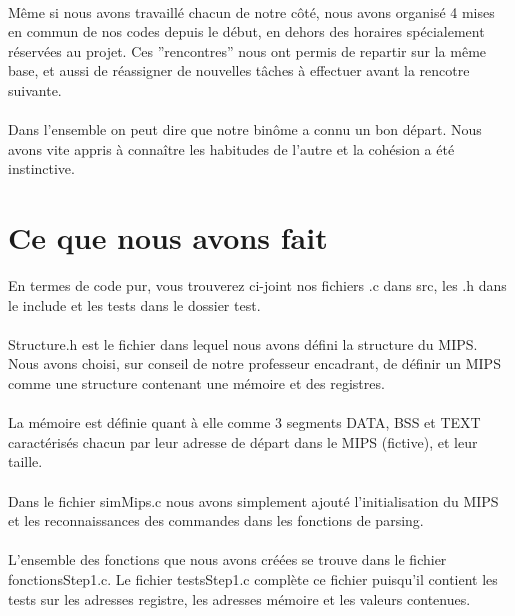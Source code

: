 \documentclass[10pt,a4paper]{report}
\begin{document}
\paragraph{}
Même si nous avons travaillé chacun de notre côté, nous avons organisé 4 mises en commun de nos codes depuis le début, en dehors des horaires spécialement réservées au projet. Ces ''rencontres'' nous ont permis de repartir sur la même base, et aussi de réassigner de nouvelles tâches à effectuer avant la rencotre suivante.
\paragraph{}	
Dans l'ensemble on peut dire que notre binôme a connu un bon départ. Nous avons vite appris à connaître les habitudes de l'autre et la cohésion a été instinctive.


\section{Ce que nous avons fait}

En termes de code pur, vous trouverez ci-joint nos fichiers .c dans src, les .h dans le include et les tests dans le dossier test.
\paragraph{}
Structure.h est le fichier dans lequel nous avons défini la structure du MIPS. Nous avons choisi, sur conseil de notre professeur encadrant, de définir un MIPS comme une structure contenant une mémoire et des registres.
\paragraph{}
La mémoire est définie quant à elle comme 3 segments DATA, BSS et TEXT caractérisés chacun par leur adresse de départ dans le MIPS (fictive), et leur taille.
\paragraph{}
Dans le fichier simMips.c nous avons simplement ajouté l'initialisation du MIPS et les reconnaissances des commandes dans les fonctions de parsing.
\paragraph{}
L'ensemble des fonctions que nous avons créées se trouve dans le fichier fonctionsStep1.c. Le fichier testsStep1.c complète ce fichier puisqu'il contient les tests sur les adresses registre, les adresses mémoire et les valeurs contenues.
\end{document}
